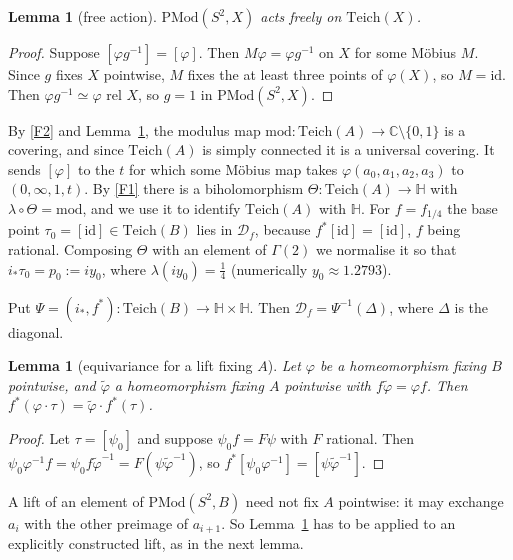 \documentclass[11pt]{article}
\newtheorem{lemma}[proposition]{Lemma}
\theoremstyle{definition}
\newcommand{\Teich}{\mathrm{Teich}}
\newcommand{\PMod}{\mathrm{PMod}}
\newcommand{\HH}{\mathbb H}
\newcommand{\D}{\mathcal D}
\begin{document}
\begin{lemma}[free action]\label{lem:free}
$\PMod(S^2,X)$ acts freely on $\Teich(X)$.
\end{lemma}


\begin{proof}
Suppose $[\varphi g^{-1}]=[\varphi]$. Then $M\varphi=\varphi g^{-1}$ on $X$ for some M\"obius $M$. Since $g$ fixes $X$ pointwise, $M$ fixes the at least three points of $\varphi(X)$, so $M=\mathrm{id}$. Then $\varphi g^{-1}\simeq\varphi$ rel $X$, so $g=1$ in $\PMod(S^2,X)$.
\end{proof}

By \ref{F2} and Lemma~\ref{lem:free}, the modulus map $\mathrm{mod}\colon\Teich(A)\to\mathbb C\setminus\{0,1\}$ is a covering, and since $\Teich(A)$ is simply connected it is a universal covering. It sends $[\varphi]$ to the $t$ for which some M\"obius map takes $\varphi(a_0,a_1,a_2,a_3)$ to $(0,\infty,1,t)$. By \ref{F1} there is a biholomorphism $\Theta\colon\Teich(A)\to\HH$ with $\lambda\circ\Theta=\mathrm{mod}$, and we use it to identify $\Teich(A)$ with $\HH$. For $f=f_{1/4}$ the base point $\tau_0=[\mathrm{id}]\in\Teich(B)$ lies in $\D_f$, because $f^*[\mathrm{id}]=[\mathrm{id}]$, $f$ being rational. Composing $\Theta$ with an element of $\Gamma(2)$ we normalise it so that $i_*\tau_0=p_0:=iy_0$, where $\lambda(iy_0)=\tfrac14$ (numerically $y_0\approx1.2793$).

Put $\Psi=(i_*,f^*)\colon\Teich(B)\to\HH\times\HH$. Then $\D_f=\Psi^{-1}(\Delta)$, where $\Delta$ is the diagonal.

\begin{lemma}[equivariance for a lift fixing $A$]\label{lem:equiv}
Let $\varphi$ be a homeomorphism fixing $B$ pointwise, and $\tilde\varphi$ a homeomorphism fixing $A$ pointwise with $f\tilde\varphi=\varphi f$. Then $f^*(\varphi\cdot\tau)=\tilde\varphi\cdot f^*(\tau)$.
\end{lemma}


\begin{proof}
Let $\tau=[\psi_0]$ and suppose $\psi_0 f=F\psi$ with $F$ rational. Then $\psi_0\varphi^{-1}f=\psi_0 f\tilde\varphi^{-1}=F(\psi\tilde\varphi^{-1})$, so $f^*[\psi_0\varphi^{-1}]=[\psi\tilde\varphi^{-1}]$.
\end{proof}

A lift of an element of $\PMod(S^2,B)$ need not fix $A$ pointwise: it may exchange $a_i$ with the other preimage of $a_{i+1}$. So Lemma~\ref{lem:equiv} has to be applied to an explicitly constructed lift, as in the next lemma.
\end{document}
